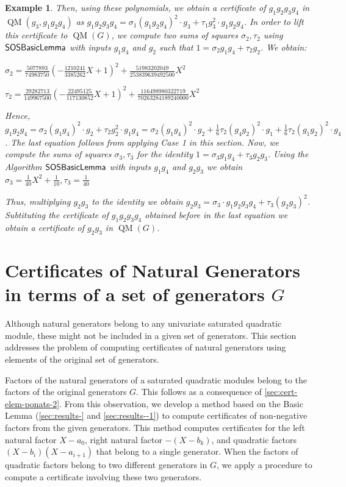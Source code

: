 \documentclass[preprint,12pt,authoryear]{elsarticle}
\newtheorem{example}[theorem]{Example}
\newenvironment{example1}
  {\begin{example}\rm}
  {\end{example}}
\DeclareMathOperator{\quadmod}{QM}
\DeclareMathOperator{\algSOSBasicLemma}{\sf SOSBasicLemma}
\begin{document}
\begin{example1}
  Then, using these polynomials, we obtain a certificate of $g_1 g_2 g_3 g_4$ in
  $\quadmod(g_3, g_1 g_2 g_4)$ as
  $g_1 g_2 g_3 g_4 = \sigma_1 (g_1 g_2 g_4)^{2} \cdot g_3 + \tau_1 g_3^{2} \cdot
  g_1 g_2 g_4$. In order to lift this certificate to $\quadmod(G)$, we compute
 two sums of squares $\sigma_2, \tau_2$ using $\algSOSBasicLemma$ with inputs
  $g_1 g_4$ and $g_2$ such that $1 = \sigma_2 g_1 g_4 + \tau_2 g_2$. We obtain:

  $\sigma_2 =
  \frac{5077893}{74983750}(-\frac{1210241}{3385262}X+1)^2
  +\frac{51983202049}{253839639492500}X^2$  


  $\tau_2 =
  \frac{29282713}{149967500}(-\frac{22495125}{117130852}X+1)^2
  +\frac{116498980322719}{70263284189240000}X^2$ 

  Hence,
  $g_1 g_2 g_4 = \sigma_2 (g_1 g_4)^{2} \cdot g_2 + \tau_2 g_2^2 \cdot g_1 g_4 =
  \sigma_2 (g_1 g_4)^{2} \cdot g_2 + \frac{1}{6} \tau_2 (g_4 g_2)^2 \cdot g_1 +
  \frac{1}{6} \tau_2 (g_1 g_2)^2 \cdot g_4$. The last equation follows from
  applying Case 1 in this section. Now, we compute the sums of squares
  $\sigma_3, \tau_3$ for the identity $1 = \sigma_3 g_1 g_4 + \tau_3 g_2
  g_3$. Using the Algorithm $\algSOSBasicLemma$ with inputs $g_1 g_4$ and
  $g_2 g_3$ we obtain $\sigma_3 = \frac{1}{40}X^2 + \frac{1}{10}, \tau_3 =
  \frac{1}{40}$ 

  Thus, multiplying $g_2 g_3$ to the identity we obtain
  $g_2 g_3 = \sigma_3 \cdot g_1 g_2 g_3 g_4 + \tau_3 (g_2 g_3)^{2}$. Subtituting
  the certificate of $g_1 g_2 g_3 g_4$ obtained before in the last equation we
  obtain a certificate of $g_2 g_3$ in $\quadmod(G)$.
\end{example1}

 \section{Certificates of Natural Generators in terms of a set of generators $G$} \label{repr_nat_gens}

Although natural generators belong to any univariate saturated quadratic
module, these might not be included in a given set of generators. This section
addresses the problem of computing certificates of natural generators using
elements of the original set of generators.

Factors of the natural generators of a saturated quadratic modules belong to the
factors of the original generators $G$. This follows as a consequence of
\th\ref{sec:cert-elem-ponats-2}. From this observation, we develop a method
based on the Basic Lemma (\th\ref{sec:results-} and \th\ref{sec:results--1}) to
compute certificates of non-negative factors from the given generators. This
method computes certificates for the left natural factor $X - a_0$, right natural
factor $-(X - b_k)$, and quadratic factors $(X - b_i)(X - a_{i+1})$ that belong
to a single generator. When the factors of quadratic factors belong to two
different generators in $G$, we apply a procedure to compute a certificate
involving these two generators.
\end{document}
